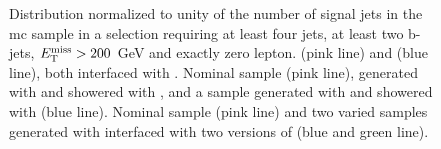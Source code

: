 \begin{figure}[htb]
\centering 
{}
\caption{Distribution normalized to unity of the number of signal jets in the \ttbar \gls{mc} sample in a selection requiring at least four jets, at least two b-jets, $E_{\rm T}^{\mathrm{miss}}>200$ GeV and exactly zero lepton. 
 \PowhegBox (pink line) and \aNLO (blue line), both interfaced with \HWpp.
 Nominal sample (pink line), generated with \PowhegBox and showered with \PY, and a sample generated with \PowhegBox and showered with \HWpp (blue line).
 Nominal sample (pink line) and two varied samples generated with \PowhegBox interfaced with two versions of \PY (blue and green line).
}\label{fig:ttbar_nj_0L_syst}
\end{figure}

